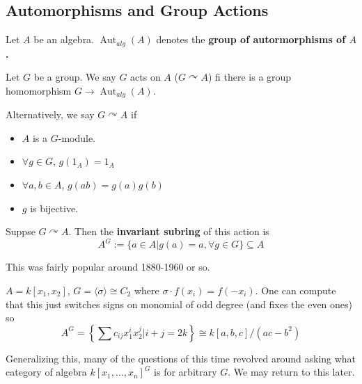 \documentclass[12pt]{article}
\theoremstyle{break}
\theoremstyle{nonumberbreak}
\theoremstyle{changebreak}
\theoremstyle{break}
\theoremstyle{nonumberbreak}
\theoremstyle{nonumberplain}
\theoremstyle{change}
\DeclareMathOperator{\Aut}{Aut}
\begin{document}
\subsection{Automorphisms and Group Actions}
Let $A$ be an algebra. $\Aut_{alg}(A)$ denotes the \textbf{group of autormorphisms of $A$.}
\begin{defn}\label{def-action}
	Let $G$ be a group. We say $G$ acts on $A$ ($G\curvearrowright A$) fi there is a group homomorphism
	$G\to \Aut_{alg}(A)$.
\end{defn}
\begin{defn}
	Alternatively, we say $G\curvearrowright A$ if
	\begin{itemize}
		\item $A$ is a $G$-module.
		\item $\forall g\in G$, $g(1_A)=1_A$
		\item $\forall a,b\in A$, $g(ab)=g(a)g(b)$
		\item $g$ is bijective.
	\end{itemize}
\end{defn}
\begin{defn}
	Suppse $G\curvearrowright A$. Then the \textbf{invariant subring} of this action is 
	\[A^G:=\{a\in A|g(a)=a,\forall g\in G\}\subseteq A\]
\end{defn}
This was fairly popular around 1880-1960 or so.
\begin{ex}
	$A=k[x_1,x_2]$, $G=\langle\sigma\rangle\cong C_2$ where
	$\sigma\cdot f(x_i)=f(-x_i)$. One can compute that this just switches signs on monomial 
	of odd degree (and fixes the even ones) so
	\[A^G=\left\{\sum c_{ij}x_1^ix_2^j|i+j=2k\right\}\cong k[a,b,c]/(ac-b^2)\]
\end{ex}
Generalizing this, many of the questions of this time revolved around asking what category of 
algebra $k[x_1,\dots,x_n]^G$ is for arbitrary $G$. We may return to this later.
\end{document}
